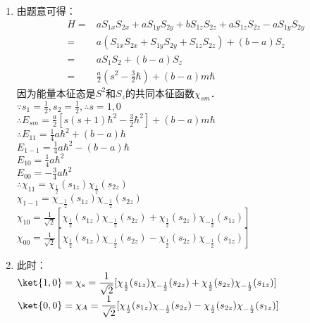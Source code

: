 \subsection{ }
\begin{enumerate}
\item 由题意可得：\\
\begin{equation}
\begin{aligned}
H =& aS_{1x}S_{2x}+aS_{1y}S_{2y}+bS_{1z}S_{2z}+aS_{1z}S_{2z}-aS_{1y}S_{2y} \\
=& a(S_{1x}S_{2x}+S_{1y}S_{2y}+S_{1z}S_{2z})+(b-a)S_{z} \\
=& aS_{1}S_{2}+(b-a)S_z \\
=& \frac{a}{2}(s^{2}-\frac{3}{2}\hbar)+(b-a)m\hbar
\end{aligned}
\end{equation}
因为能量本征态是$S^{2}$和$S_{z}$的共同本征函数$\chi_{sm}$．\\
$\displaystyle \because s_{1}=\frac{1}{2},s_{2}=\frac{1}{2},\therefore s=1,0 $ \\
$\displaystyle \therefore E_{sm}=\frac{a}{2}[s(s+1)\hbar^{2}-\frac{3}{2}\hbar^{2}]+(b-a)m\hbar $ \\
$\displaystyle \therefore E_{11}=\frac{1}{4}a\hbar^{2}+(b-a)\hbar $ \\
$\displaystyle E_{1-1}=\frac{1}{4}a\hbar^{2}-(b-a)\hbar $ \\
$\displaystyle E_{10}=\frac{1}{4}a\hbar^{2} $ \\
$\displaystyle E_{00}=-\frac{3}{4}a\hbar^{2} $ \\
$\displaystyle \therefore \chi_{11}=\chi_{\frac{1}{2}}(s_{1z})\chi_{\frac{1}{2}}(s_{2z}) $ \\
$\displaystyle \chi_{1-1}=\chi_{-\frac{1}{2}}(s_{1z})\chi_{-\frac{1}{2}}(s_{2z}) $ \\
$\displaystyle \chi_{10}=\frac{1}{\sqrt{2}}[\chi_{\frac{1}{2}}(s_{1z})\chi_{-\frac{1}{2}}(s_{2z})+\chi_{\frac{1}{2}}(s_{2z})\chi_{-\frac{1}{2}}(s_{1z})] $ \\
$\displaystyle \chi_{00}=\frac{1}{\sqrt{2}}[\chi_{\frac{1}{2}}(s_{1z})\chi_{-\frac{1}{2}}(s_{2z})-\chi_{\frac{1}{2}}(s_{2z})\chi_{-\frac{1}{2}}(s_{1z})] $ 
\item 此时：\\
$\displaystyle \ket{1,0}=\chi_{s}=\frac{1}{\sqrt{2}}[\chi_{\frac{1}{2}}(s_{1z})\chi_{-\frac{1}{2}}(s_{2z})+\chi_{\frac{1}{2}}(s_{2z})\chi_{-\frac{1}{2}}(s_{1z})] $ \\
$\displaystyle \ket{0,0}=\chi_{A}=\frac{1}{\sqrt{2}}[\chi_{\frac{1}{2}}(s_{1z})\chi_{-\frac{1}{2}}(s_{2z})-\chi_{\frac{1}{2}}(s_{2z})\chi_{-\frac{1}{2}}(s_{1z})] $
\end{enumerate}